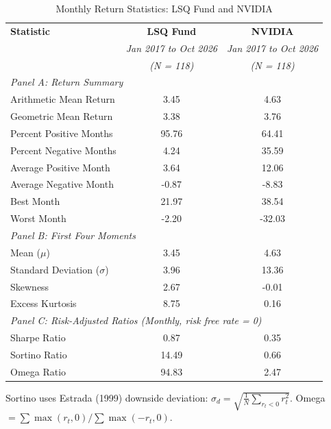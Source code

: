 \begin{table}[H]
\centering
\caption{Monthly Return Statistics: LSQ Fund and NVIDIA}
\label{tab:updated-table-4}
\small
\begin{tabular}{lcc}
\toprule
\textbf{Statistic} & \textbf{LSQ Fund} & \textbf{NVIDIA} \\
& \emph{Jan 2017 to Oct 2026} & \emph{Jan 2017 to Oct 2026} \\
& \emph{(N = 118)} & \emph{(N = 118)} \\
\midrule
\multicolumn{3}{l}{\emph{Panel A: Return Summary}} \\
\midrule
Arithmetic Mean Return & 3.45 & 4.63 \\
Geometric Mean Return & 3.38 & 3.76 \\
Percent Positive Months & 95.76 & 64.41 \\
Percent Negative Months & 4.24 & 35.59 \\
Average Positive Month & 3.64 & 12.06 \\
Average Negative Month & -0.87 & -8.83 \\
Best Month & 21.97 & 38.54 \\
Worst Month & -2.20 & -32.03 \\
\midrule
\multicolumn{3}{l}{\emph{Panel B: First Four Moments}} \\
\midrule
Mean ($\mu$) & 3.45 & 4.63 \\
Standard Deviation ($\sigma$) & 3.96 & 13.36 \\
Skewness & 2.67 & -0.01 \\
Excess Kurtosis & 8.75 & 0.16 \\
\midrule
\multicolumn{3}{l}{\emph{Panel C: Risk-Adjusted Ratios (Monthly, risk free rate = 0)}} \\
\midrule
Sharpe Ratio & 0.87 & 0.35 \\
Sortino Ratio & 14.49 & 0.66 \\
Omega Ratio & 94.83 & 2.47 \\
\bottomrule
\end{tabular}

\vspace{0.15cm}
\begin{minipage}{0.92\linewidth}
\footnotesize
Sortino uses Estrada (1999) downside deviation:
$\sigma_d=\sqrt{\frac{1}{N}\sum_{r_t<0}r_t^2}$.
Omega $= \sum \max(r_t,0) / \sum \max(-r_t,0)$.
\end{minipage}
\end{table}
